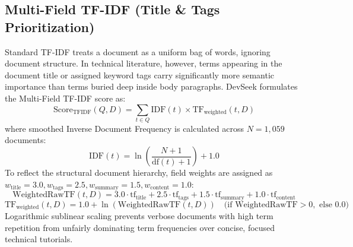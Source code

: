 \documentclass[12pt,a4paper]{article}
\begin{document}
\subsection{Multi-Field TF-IDF (Title \& Tags Prioritization)}
Standard TF-IDF treats a document as a uniform bag of words, ignoring document structure. In technical literature, however, terms appearing in the document title or assigned keyword tags carry significantly more semantic importance than terms buried deep inside body paragraphs. DevSeek formulates the Multi-Field TF-IDF score as:
\begin{equation}
\text{Score}_{\text{TFIDF}}(Q, D) = \sum_{t \in Q} \text{IDF}(t) \times \text{TF}_{\text{weighted}}(t, D)
\end{equation}
where smoothed Inverse Document Frequency is calculated across $N = 1,059$ documents:
\begin{equation}
\text{IDF}(t) = \ln \left( \frac{N + 1}{\text{df}(t) + 1} \right) + 1.0
\end{equation}
To reflect the structural document hierarchy, field weights are assigned as $w_{\text{title}} = 3.0, w_{\text{tags}} = 2.5, w_{\text{summary}} = 1.5, w_{\text{content}} = 1.0$:
\begin{equation}
\text{WeightedRawTF}(t, D) = 3.0 \cdot \text{tf}_{\text{title}} + 2.5 \cdot \text{tf}_{\text{tags}} + 1.5 \cdot \text{tf}_{\text{summary}} + 1.0 \cdot \text{tf}_{\text{content}}
\end{equation}
\begin{equation}
\text{TF}_{\text{weighted}}(t, D) = 1.0 + \ln(\text{WeightedRawTF}(t, D)) \quad \text{(if } \text{WeightedRawTF} > 0, \text{ else } 0.0)
\end{equation}
Logarithmic sublinear scaling prevents verbose documents with high term repetition from unfairly dominating term frequencies over concise, focused technical tutorials.
\end{document}

